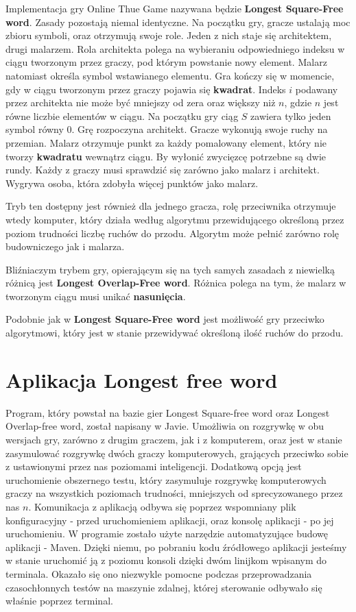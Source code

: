 \documentclass[document]{xmgr}
\begin{document}
Implementacja gry Online Thue Game nazywana będzie \textbf{Longest Square-Free word}.
Zasady pozostają niemal identyczne. Na początku gry, gracze ustalają moc zbioru symboli, oraz otrzymują swoje role. Jeden z nich staje się architektem, drugi malarzem. Rola architekta polega na wybieraniu odpowiedniego indeksu w ciągu tworzonym przez graczy, pod którym powstanie nowy element. Malarz natomiast określa symbol wstawianego elementu. Gra kończy się w momencie, gdy w ciągu tworzonym przez graczy pojawia się \textbf{kwadrat}. Indeks $i$  podawany przez architekta nie może być mniejszy od zera oraz większy niż $n$, gdzie $n$ jest równe liczbie elementów w ciągu. Na początku gry ciąg $S$ zawiera tylko jeden symbol równy 0.
Grę rozpoczyna architekt. Gracze wykonują swoje ruchy na przemian. Malarz otrzymuje punkt za każdy pomalowany element, który nie tworzy \textbf{kwadratu} wewnątrz ciągu.
By wyłonić zwycięzcę potrzebne są dwie rundy. Każdy z graczy musi sprawdzić się zarówno jako malarz i architekt. Wygrywa osoba, która zdobyła więcej punktów jako malarz.

Tryb ten dostępny jest również dla jednego gracza, rolę przeciwnika otrzymuje wtedy komputer, który działa według algorytmu przewidującego określoną przez poziom trudności liczbę ruchów do przodu. Algorytm może pełnić zarówno rolę budowniczego jak i malarza.

Bliźniaczym trybem gry, opierającym się na tych samych zasadach z niewielką różnicą jest \textbf{Longest Overlap-Free word}. 
Różnica polega na tym, że malarz w tworzonym ciągu musi unikać \textbf{nasunięcia}.

Podobnie jak w \textbf{Longest Square-Free word} jest możliwość gry przeciwko algorytmowi, który jest w stanie przewidywać określoną ilość ruchów do przodu.

\chapter{Aplikacja Longest free word}
Program, który powstał na bazie gier Longest Square-free word oraz Longest Overlap-free word, został napisany w Javie. Umożliwia on rozgrywkę w obu wersjach gry, zarówno z drugim graczem, jak i z komputerem, oraz jest w stanie zasymulować rozgrywkę dwóch graczy komputerowych, grających przeciwko sobie z ustawionymi przez nas poziomami inteligencji. Dodatkową opcją jest uruchomienie obszernego testu, który zasymuluje rozgrywkę komputerowych graczy na wszystkich poziomach trudności, mniejszych od sprecyzowanego przez nas $n$. Komunikacja z aplikacją odbywa się poprzez wspomniany plik konfiguracyjny - przed uruchomieniem aplikacji, oraz konsolę aplikacji - po jej uruchomieniu. W programie zostało użyte narzędzie automatyzujące budowę aplikacji - Maven. Dzięki niemu, po pobraniu kodu źródłowego aplikacji jesteśmy w stanie uruchomić ją z poziomu konsoli dzięki dwóm linijkom wpisanym do terminala. Okazało się ono niezwykle pomocne podczas przeprowadzania czasochłonnych testów na maszynie zdalnej, której sterowanie odbywało się właśnie poprzez terminal.
\end{document}

